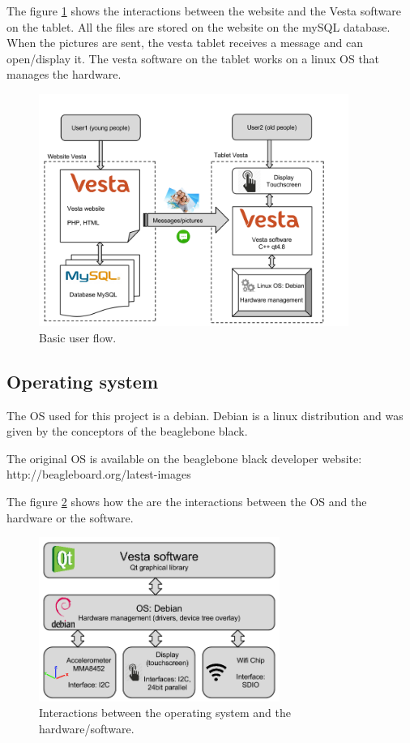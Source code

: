 \clearpage

The figure \ref{fig:user flow} shows the interactions between the website and the Vesta software on the tablet. All the files are stored on the website on the mySQL database. When the pictures are sent, the vesta tablet receives a message and can open/display it. The vesta software on the tablet works on a linux OS that manages the hardware.

\begin{figure}[!htb]
    \centering
    \includegraphics[width=0.9\textwidth,keepaspectratio]{chap/softFig/block_diagram_vesta2.png}
    \caption{Basic user flow.}
    \label{fig:user flow}
\end{figure}

\clearpage

\subsection{Operating system}
The OS used for this project is a debian. Debian is a linux distribution and was given by the conceptors of the beaglebone black.

The original OS is available on the beaglebone black developer website: http://beagleboard.org/latest-images

The figure \ref{fig:OS} shows how the are the interactions between the OS and the hardware or the software.
 
\begin{figure}[!htb]
    \centering
    \includegraphics[width=0.7\textwidth,keepaspectratio]{chap/softFig/first_diagram2}
    \caption{Interactions between the operating system and the hardware/software.}
    \label{fig:OS}
\end{figure}

